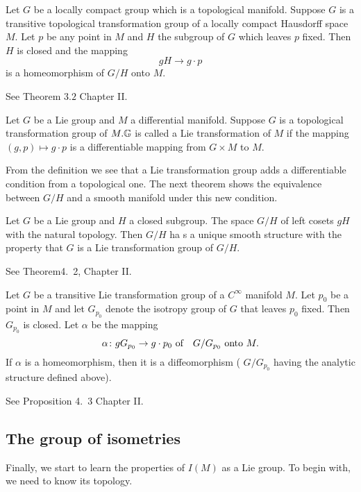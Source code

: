 \begin{theorem}
	Let $G$ be a locally compact group which is a topological
	manifold. Suppose $G$ is a transitive topological
	transformation group of a locally compact Hausdorff space
	$M$. Let $p$ be any point in $M$ and $H$ the subgroup of $G$
	which leaves $p$ fixed. Then ${H}$ is closed and the mapping
	\[
	g H \rightarrow g \cdot p
	\]
	is a homeomorphism of $G / H$ onto $M$.
\end{theorem}
\bproof
See \cite{Hel} Theorem $3.2$ Chapter II.
\eproof
\begin{definition}
	Let $G$ be a Lie group and $M$ a differential manifold.
	Suppose $G$ is a topological transformation group of $M .\G$ is
	called a Lie transformation of $M$ if the mapping $(g, p)
	\mapsto g \cdot p$ is a differentiable mapping from $G \times
	M$ to $M$.
\end{definition}

From the definition we see that a Lie transformation group adds a
differentiable condition from a topological one. The next theorem
shows the equivalence between $G / H$ and a smooth manifold under
this new condition.

\begin{theorem}
Let $G$ be a Lie group and $H$ a closed subgroup.  The space $G / H$
of left cosets $g H$ with the natural topology. Then $G / H$ ha
s a unique smooth structure with the property that $G$ is a Lie
transformation group of $G / H$.	
\end{theorem}
\bproof
See \cite{Hel} Theorem4.\ 2, Chapter II.
\eproof

\begin{proposition}
	Let $G$ be a transitive Lie transformation group of a
	$C^{\infty}$ manifold $M$. Let $p_{0}$ be a point in $M$ and
	let $G_{p_{0}}$ denote the isotropy group of $G$ that leaves
	$p_{0}$ fixed. Then $G_{p_0}$ is closed. Let $\alpha$ be the
	mapping
	\[
	\alpha\:g G_{p_{0}} \rightarrow g \cdot p_{0} \text { of \
	}\  G / G_{p_{0}} \text { onto } M.
	\]
	If $\alpha$ is a homeomorphism, then it is a diffeomorphism (
	$G / G_{p_{0}}$ having the analytic structure defined above).
\end{proposition}
\bproof
See \cite{Hel} Proposition 4.\ 3 Chapter II.
\eproof
\subsection{The group of isometries}

Finally, we start to learn the properties of $I(M)$ as a Lie
group. To begin with, we need to know its topology. 

